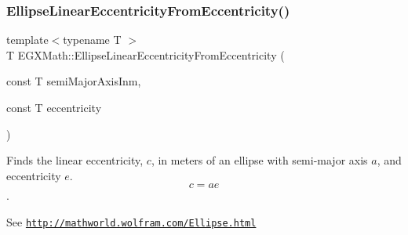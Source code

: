 \subsubsection{\texorpdfstring{Ellipse\+Linear\+Eccentricity\+From\+Eccentricity()}{EllipseLinearEccentricityFromEccentricity()}}
{\footnotesize\ttfamily template$<$typename T $>$ \\
T E\+G\+X\+Math\+::\+Ellipse\+Linear\+Eccentricity\+From\+Eccentricity (\begin{DoxyParamCaption}\item[{const T}]{semi\+Major\+Axis\+Inm,  }\item[{const T}]{eccentricity }\end{DoxyParamCaption})}



Finds the linear eccentricity, $c$, in meters of an ellipse with semi-\/major axis $a$, and eccentricity $e$. \[ c=a e \]. 

See \href{http://mathworld.wolfram.com/Ellipse.html}{\tt http\+://mathworld.\+wolfram.\+com/\+Ellipse.\+html}


